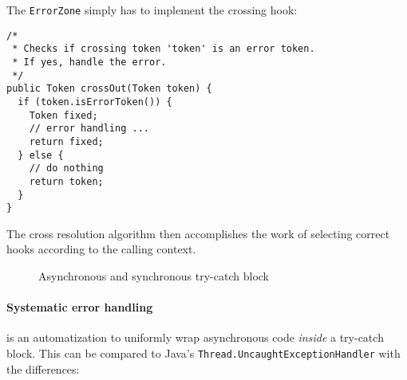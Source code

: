 The \lstinline{ErrorZone} simply has to implement the crossing hook:

\begin{lstlisting}
/*
 * Checks if crossing token 'token' is an error token.
 * If yes, handle the error.
 */
public Token crossOut(Token token) {
  if (token.isErrorToken()) {
    Token fixed;
    // error handling ...
    return fixed;
  } else {
    // do nothing
    return token;
  }
}
\end{lstlisting}

The cross resolution algorithm then accomplishes the work of selecting correct hooks according to the calling context.

\begin{figure}[H]
\centering
{}
\caption{Asynchronous and synchronous try-catch block}
\label{fig:sas-tc}
\end{figure}

\paragraph{Systematic error handling} is an automatization to uniformly wrap asynchronous code \emph{inside} a try-catch block. This can be compared to Java's \lstinline{Thread.UncaughtExceptionHandler} with the differences:

